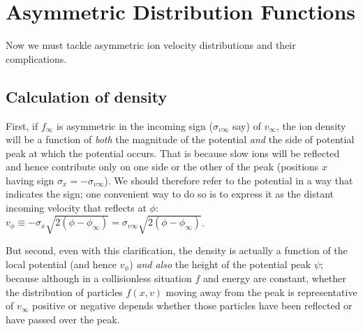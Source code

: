 \documentclass[pre]{revtex4-2}
\begin{document}
\section{Asymmetric Distribution Functions}\label{sec2}

Now we must tackle asymmetric ion velocity distributions and their
complications.

\subsection{Calculation of density}

First, if $f_\infty$ is asymmetric in the incoming sign ($\sigma_{v\infty}$ say)
of $v_\infty$, the ion density will be a function of \emph{both} the
magnitude of the potential \emph{and} the side of potential peak at
which the potential occurs. That is because slow ions will be
reflected and hence contribute only on one side or the other of the
peak (positions $x$ having sign $\sigma_x=-\sigma_{v\infty}$). We should
therefore refer to the potential in a way that indicates the sign; one
convenient way to do so is to express it as the distant incoming
velocity that reflects at $\phi$:
$v_\phi\equiv-\sigma_x\sqrt{2(\phi-\phi_\infty)}=\sigma_{v\infty}\sqrt{2(\phi-\phi_\infty)}$.

But second, even with this clarification, the density is actually a
function of the local potential (and hence $v_\phi$) \emph{and also} the
height of the potential peak $\psi$; because although in a
collisionless situation $f$ and energy are constant, whether the
distribution of particles $f(x,v)$ moving away from the peak is
representative of $v_\infty$ positive or negative depends whether
those particles have been reflected or have passed over the peak.
\end{document}
